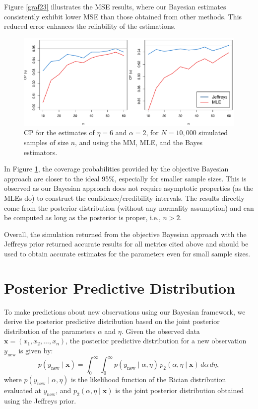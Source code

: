 \documentclass[12pt]{interact}
\theoremstyle{plain}%
\theoremstyle{definition}
\theoremstyle{remark}
\begin{document}
Figure \ref{graf23} illustrates the MSE results, where our Bayesian estimates consistently exhibit lower MSE than those obtained from other methods. This reduced error enhances the reliability of the estimations.
\begin{figure}[!h]
\centering
\includegraphics[scale=0.5]{fig3.pdf}
\caption{CP for the estimates of $\eta =6$ and $\alpha = 2$, for $N=10,000$ simulated samples of size $n$, and using the MM, MLE, and the Bayes estimators.}
\label{graf24}
\end{figure}

In Figure \ref{graf24}, the coverage probabilities provided by the objective Bayesian approach are closer to the ideal 95\%, especially for smaller sample sizes. This is observed as our Bayesian approach does not require asymptotic properties (as the MLEs do) to construct the confidence/credibility intervals. The results directly come from the posterior distribution (without any normality assumption) and can be computed as long as the posterior is proper, i.e., \(n > 2\).

Overall, the simulation returned from the objective Bayesian approach with the Jeffreys prior returned accurate results for all metrics cited above and should be used to obtain accurate estimates for the parameters even for small sample sizes.


\section{Posterior Predictive Distribution}

To make predictions about new observations using our Bayesian framework, we derive the posterior predictive distribution based on the joint posterior distribution of the parameters \(\alpha\) and \(\eta\). Given the observed data \(\boldsymbol{x} = (x_1, x_2, \dots, x_n)\), the posterior predictive distribution for a new observation \(y_{\text{new}}\) is given by:
\begin{equation}\label{post_pred}
p(y_{\text{new}} \mid \boldsymbol{x}) = \int_0^\infty \int_0^\infty p(y_{\text{new}} \mid \alpha, \eta) \, p_2(\alpha, \eta \mid \boldsymbol{x}) \, d\alpha \, d\eta,
\end{equation}
where \(p(y_{\text{new}} \mid \alpha, \eta)\) is the likelihood function of the Rician distribution evaluated at \(y_{\text{new}}\), and \(p_2(\alpha, \eta \mid \boldsymbol{x})\) is the joint posterior distribution obtained using the Jeffreys prior.
\end{document}
